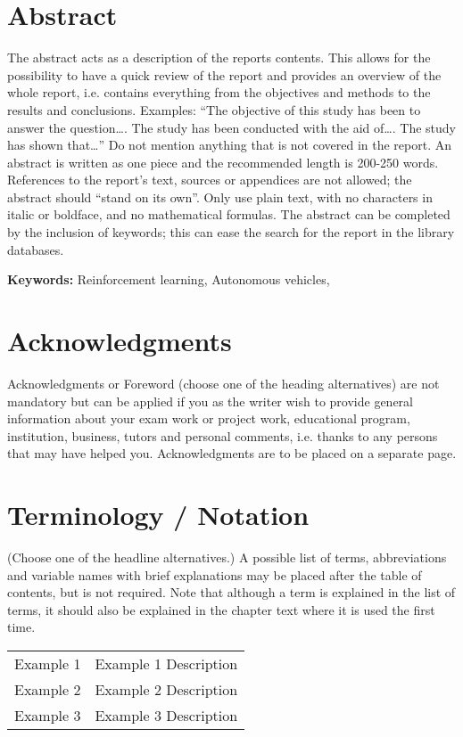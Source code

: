 \chapter*{Abstract}
    The abstract acts as a description of the reports contents. This allows for the possibility to have a quick review of the report and provides an overview of the whole report, i.e. contains everything from the objectives and methods to the results and conclusions. Examples: “The objective of this study has been to answer the question…. The study has been conducted with the aid of…. The study has shown that…” Do not mention anything that is not covered in the report. An abstract is written as one piece and the recommended length is 200-250 words. References to the report's text, sources or appendices are not allowed; the abstract should “stand on its own”. Only use plain text, with no characters in italic or boldface, and no mathematical formulas. The abstract can be completed by the inclusion of keywords; this can ease the search for the report in the library databases.

    \textbf{Keywords:} Reinforcement learning, Autonomous vehicles,
\chapter*{Acknowledgments}
    Acknowledgments or Foreword (choose one of the heading alternatives) are not mandatory but can be applied if you as the writer wish to provide general information about your exam work or project work, educational program, institution, business, tutors and personal comments, i.e. thanks to any persons that may have helped you. Acknowledgments are to be placed on a separate page.

{\normalfont\sffamily
    \tableofcontents
}

\chapter*{Terminology / Notation}
    (Choose one of the headline alternatives.) A possible list of terms, abbreviations and variable names with brief explanations may be placed after the table of contents, but is not required. Note that although a term is explained in the list of terms, it should also be explained in the chapter text where it is used the first time.
    \begin{center}
        \begin{tabularx}{\textwidth}{ X  X }
            Example 1 & Example 1 Description \\ 
            Example 2 & Example 2 Description \\ 
            Example 3 & Example 3 Description \\ 
        \end{tabularx}
    \end{center}